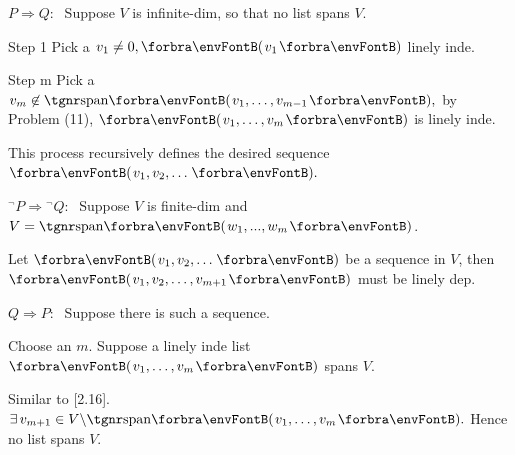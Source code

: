 \par\quad
$P\Rightarrow Q:\;$ Suppose $V$ is infinite-dim, so that no list spans $V$.\par\quad
{} {\tgbf Step 1}\;\; Pick a $v_1\neq 0,\Par{v_1}$ linely inde.\par\quad
{} {\tgbf Step m}\; Pick a $v_m\not\in\Span{v_1,\dots,v_{m-1}},$ by Problem (11), $\Par{v_1,\dots,v_m}$ is linely inde.\par\quad
{} This process recursively defines the desired sequence $\Par{v_1,v_2,\dots}.$\vspace{4pt}\par\quad
${}^\neg P\Rightarrow{}^\neg Q:\;$ Suppose $V$ is finite-dim and $V=\Span{w_1 , ..., w_m}$.\par\quad
{} Let $\Par{v_1 , v_2 , \dots}$ be a sequence in $V$, then $\Par{v_1,v_2,\dots,v_{m+1}}$ must be linely dep.\vspace{4pt}\par\quad
\Or\; $Q\Rightarrow P:\;$ Suppose there is such a sequence.\par\quad
{} Choose an $m$. Suppose a linely inde list $\Par{v_1,\dots,v_m}$ spans $V$.\par\quad
{} Similar to [2.16]. $\exists\,v_{m+1}\in V\backslash\Span{v_1,\dots,v_m}.$ Hence no list spans $V.$\PfEnd
\SepLine


